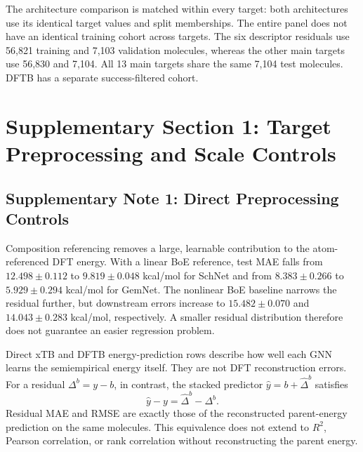 The architecture comparison is matched within every target: both architectures use its identical target values and split memberships. The entire panel does not have an identical training cohort across targets. The six descriptor residuals use 56,821 training and 7,103 validation molecules, whereas the other main targets use 56,830 and 7,104. All 13 main targets share the same 7,104 test molecules. DFTB has a separate success-filtered cohort.

\clearpage
\section*{Supplementary Section 1: Target Preprocessing and Scale Controls}
\subsection*{Supplementary Note 1: Direct Preprocessing Controls}
Composition referencing removes a large, learnable contribution to the atom-referenced DFT energy. With a linear BoE reference, test MAE falls from \(12.498\pm0.112\) to \(9.819\pm0.048\) kcal/mol for SchNet and from \(8.383\pm0.266\) to \(5.929\pm0.294\) kcal/mol for GemNet. The nonlinear BoE baseline narrows the residual further, but downstream errors increase to \(15.482\pm0.070\) and \(14.043\pm0.283\) kcal/mol, respectively. A smaller residual distribution therefore does not guarantee an easier regression problem.




Direct xTB and DFTB energy-prediction rows describe how well each GNN learns the semiempirical energy itself. They are not DFT reconstruction errors. For a residual \(\Delta^b=y-b\), in contrast, the stacked predictor \(\hat y=b+\widehat{\Delta}^b\) satisfies
\begin{equation}
 \hat y-y=\widehat{\Delta}^b-\Delta^b.
 \label{eq:si-error-equivalence}
\end{equation}
Residual MAE and RMSE are exactly those of the reconstructed parent-energy prediction on the same molecules. This equivalence does not extend to \(R^2\), Pearson correlation, or rank correlation without reconstructing the parent energy.

